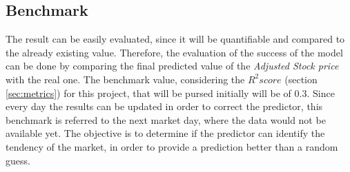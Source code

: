 \subsection{Benchmark}
\label{subsec:bench}
The result can be easily evaluated, since it will be quantifiable and compared to the already existing value. Therefore, the evaluation of the success of the model can be done by comparing the final
predicted value of the \emph{Adjusted Stock price} with the real one. The benchmark value, considering the $R^2 score$ (section \ref{sec:metrics}) for this project, that will be pursed initially will be of 0.3.
Since every day the results can be updated in order to correct the predictor, this benchmark is referred to the next market day, where the data would not be available yet. The objective is to determine if the predictor
can identify the tendency of the market, in order to provide a prediction better than a random guess. 
\\